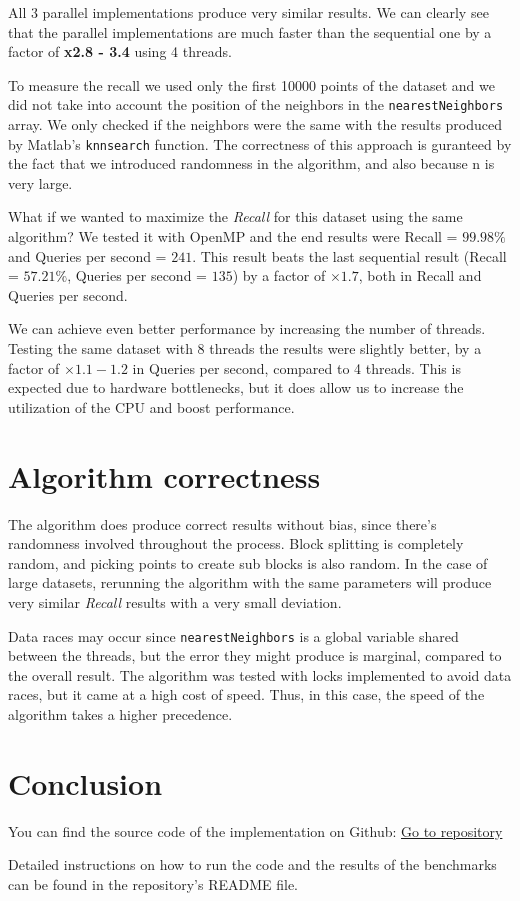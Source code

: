 \documentclass{article}
\begin{document}
All 3 parallel implementations produce very similar results. 
We can clearly see that the parallel implementations are much faster than the sequential one
by a factor of \textbf{x2.8 - 3.4} using 4 threads.

To measure the recall we used only the first 10000 points of the dataset and we did not take into account
the position of the neighbors in the \texttt{nearestNeighbors} array. We only checked if the neighbors were the same
with the results produced by Matlab's \texttt{knnsearch} function. The correctness of this approach is guranteed
by the fact that we introduced randomness in the algorithm, and also because n is very large.

What if we wanted to maximize the \emph{Recall} for this dataset using the same algorithm?
We tested it with OpenMP and the end results were Recall = $99.98\%$ and Queries per second = $241$.
This result beats the last sequential result (Recall = $57.21\%$, Queries per second = $135$) by a factor of $\times1.7$, 
both in Recall and Queries per second.

We can achieve even better performance by increasing the number of threads. Testing the same dataset with 8 threads the
results were slightly better, by a factor of $\times1.1-1.2$ in Queries per second, compared to 4 threads. This is expected due to hardware
bottlenecks, but it does allow us to increase the utilization of the CPU and boost performance.

\section{Algorithm correctness}
The algorithm does produce correct results without bias, since there's randomness involved throughout the process.
Block splitting is completely random, and picking points to create sub blocks is also random. In the case of large datasets, rerunning the
algorithm with the same parameters will produce very similar \emph{Recall} results with a very small deviation.

Data races may occur since \texttt{nearestNeighbors} is a global variable shared between the threads, but the error they might produce 
is marginal, compared to the overall result. The algorithm was tested with locks implemented to avoid data races, but it came at 
a high cost of speed. Thus, in this case, the speed of the algorithm takes a higher precedence.

\section{Conclusion}
You can find the source code of the implementation on Github: 
\href{https://github.com/NontasBak/auth-parallel-ex1}{Go to repository}

Detailed instructions on how to run the code and the results of the benchmarks can be found in the repository's README file.
\end{document}
